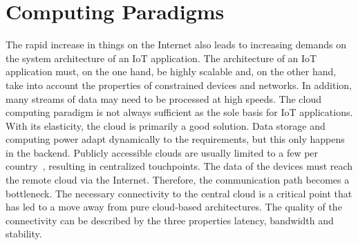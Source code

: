 \documentclass[english,version-2019-11]{uzl-thesis}
\begin{document}
\section{Computing Paradigms}
The rapid increase in things on the Internet also leads to increasing demands on the system architecture of an IoT application.
The architecture of an IoT application must,
on the one hand, be highly scalable and,
on the other hand, take into account the properties
of constrained devices and networks.
In addition, many streams of data may need to be processed at high speeds.
The cloud computing paradigm is not always sufficient as the sole basis for IoT applications.
With its elasticity, the cloud is primarily
a good solution. Data storage and computing power
adapt dynamically to the requirements,
but this only happens in the backend.
Publicly accessible clouds are
usually limited to a few per country~\cite{DemystifyingFog},
resulting in centralized touchpoints.
The data of the devices must reach the remote cloud
via the Internet. Therefore, the communication path becomes a bottleneck.
The necessary connectivity
to the central cloud is a critical point that
has led to a move away from pure cloud-based
architectures. The quality of the connectivity
can be described by the three properties latency,
bandwidth and stability.
\end{document}
